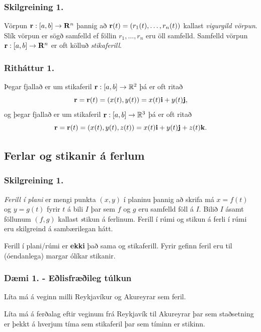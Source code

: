 \subsubsection{Skilgreining 1.}
Vörpun $\mbox{${\bf r}$}:  [a,b]\rightarrow \mbox{${\bf R}^n$}$ þannig að $\mbox{${\bf r}$}(t)=(r_1(t),\ldots,r_n(t))$ kallast {\em vigurgild vörpun}.  Slík vörpun er sögð samfelld ef föllin $r_1, \ldots, r_n$ eru öll samfelld.  Samfelld vörpun $\mbox{${\bf r}$}:  [a,b]\rightarrow \mbox{${\bf R}^n$}$ er oft kölluð {\em stikaferill}.



\subsubsection{Ritháttur 1.}
 Þegar fjallað er um stikaferil $\mbox{${\bf r}$}:  [a,b]\rightarrow {\mathbb R}^2$ þá er oft ritað
$$\mbox{${\bf r}$}=\mbox{${\bf r}$}(t)=(x(t),y(t))=x(t)\mbox{${\bf i}$}+y(t)\mbox{${\bf j}$},$$
og þegar fjallað er um stikaferil $\mbox{${\bf r}$}:  [a,b]\rightarrow {\mathbb R}^3$ þá er oft ritað
$$\mbox{${\bf r}$}=\mbox{${\bf r}$}(t)=(x(t),y(t),z(t))=x(t)\mbox{${\bf i}$}+y(t)\mbox{${\bf j}$}+z(t)\mbox{${\bf k}$}.$$



\subsection{Ferlar og stikanir á ferlum}
\subsubsection{Skilgreining 1.}
{\em Ferill í plani} er mengi punkta $(x,y)$ í planinu þannig að skrifa má $x=f(t)$ og $y=g(t)$ fyrir $t$ á bili $I$ þar sem $f$ og $g$ eru samfelld föll á $I$. Bilið $I$ ásamt föllunum $(f,g)$ kallast {\emph stikun} á ferlinum. Ferill í rúmi og stikun á ferli í rúmi eru skilgreind á sambærilegan hátt.


Ferill í plani/rúmi er \textbf{ekki} það sama og stikaferill. Fyrir gefinn feril eru til (óendanlega) margar ólíkar stikanir.
\pause
\subsubsection{Dæmi 1. - Eðlisfræðileg túlkun}
Líta má á veginn milli Reykjavíkur og Akureyrar sem feril.

Líta má á ferðalag eftir veginum frá Reykjavík til Akureyrar þar sem staðsetning er þekkt á hverjum tíma sem stikaferil þar sem tíminn er stikinn.

\pause

